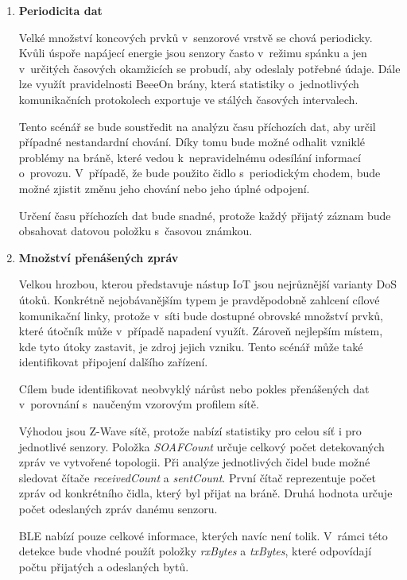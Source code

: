    \begin{enumerate}
    \item \textbf{Periodicita dat}
    
    Velké množství koncových prvků v~senzorové vrstvě se chová periodicky. Kvůli úspoře napájecí
    energie jsou senzory často v~režimu spánku a jen v~určitých časových okamžicích se probudí, 
    aby odeslaly potřebné údaje. Dále lze využít pravidelnosti BeeeOn brány, která statistiky
    o~jednotlivých komunikačních protokolech exportuje ve stálých časových intervalech. 
    
    Tento scénář se bude soustředit na analýzu času příchozích dat, aby určil případné
    nestandardní chování. Díky tomu bude možné odhalit vzniklé problémy na bráně, které vedou
k~nepravidelnému odesílání informací o~provozu. V~případě, že bude použito čidlo s~periodickým 
    chodem, bude možné zjistit změnu jeho chování nebo jeho úplné odpojení.
    
    Určení času příchozích dat bude snadné, protože každý přijatý záznam bude obsahovat 
    datovou položku s~časovou známkou.
    
    \item \textbf{Množství přenášených zpráv} \label{dos}
    
    Velkou hrozbou, kterou představuje nástup IoT jsou nejrůznější varianty DoS útoků. Konkrétně
    nejobávanějším typem je pravděpodobně zahlcení cílové komunikační linky, protože v~síti bude 
    dostupné obrovské množství prvků, které útočník může v~případě napadení využít. Zároveň
    nejlepším místem, kde tyto útoky zastavit, je zdroj jejich vzniku. Tento scénář může také 
    identifikovat připojení dalšího zařízení.
        
    Cílem bude identifikovat neobvyklý nárůst nebo pokles přenášených dat v~porovnání 
    s~naučeným vzorovým profilem sítě. 
    
    Výhodou jsou Z-Wave sítě, protože nabízí statistiky pro celou síť i pro jednotlivé senzory. 
    Položka \textit{SOAFCount} určuje celkový počet detekovaných zpráv ve vytvořené topologii.
    Při analýze
    jednotlivých čidel bude možné sledovat čítače \textit{receivedCount} a \textit{sentCount}.
    První čítač reprezentuje počet zpráv od konkrétního
    čidla, který byl přijat na bráně. Druhá hodnota určuje počet odeslaných zpráv danému
    senzoru.
    
    BLE nabízí pouze celkové informace, kterých navíc není tolik. V~rámci této detekce bude vhodné 
    použít položky \textit{rxBytes} a \textit{txBytes}, které odpovídají počtu přijatých
    a odeslaných bytů.
    

\end{enumerate}
